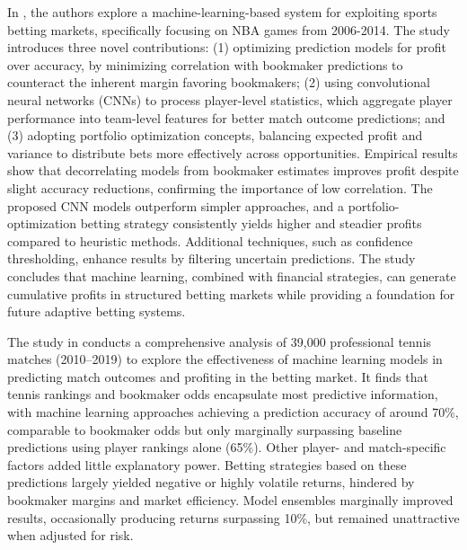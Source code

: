 \documentclass[12pt,twoside]{report}
\begin{document}
In \citep{hubacek_2019}, the authors explore a machine-learning-based system for exploiting sports betting markets, specifically focusing on NBA games from 2006-2014. The study introduces three novel contributions: (1) optimizing prediction models for profit over accuracy, by minimizing correlation with bookmaker predictions to counteract the inherent margin favoring bookmakers; (2) using convolutional neural networks (CNNs) to process player-level statistics, which aggregate player performance into team-level features for better match outcome predictions; and (3) adopting portfolio optimization concepts, balancing expected profit and variance to distribute bets more effectively across opportunities. Empirical results show that decorrelating models from bookmaker estimates improves profit despite slight accuracy reductions, confirming the importance of low correlation. The proposed CNN models outperform simpler approaches, and a portfolio-optimization betting strategy consistently yields higher and steadier profits compared to heuristic methods. Additional techniques, such as confidence thresholding, enhance results by filtering uncertain predictions. The study concludes that machine learning, combined with financial strategies, can generate cumulative profits in structured betting markets while providing a foundation for future adaptive betting systems.

The study in \citep{wilkens_2021} conducts a comprehensive analysis of 39,000 professional tennis matches (2010–2019) to explore the effectiveness of machine learning models in predicting match outcomes and profiting in the betting market. It finds that tennis rankings and bookmaker odds encapsulate most predictive information, with machine learning approaches achieving a prediction accuracy of around 70\%, comparable to bookmaker odds but only marginally surpassing baseline predictions using player rankings alone (65\%). Other player- and match-specific factors added little explanatory power. Betting strategies based on these predictions largely yielded negative or highly volatile returns, hindered by bookmaker margins and market efficiency. Model ensembles marginally improved results, occasionally producing returns surpassing 10\%, but remained unattractive when adjusted for risk.
\end{document}
